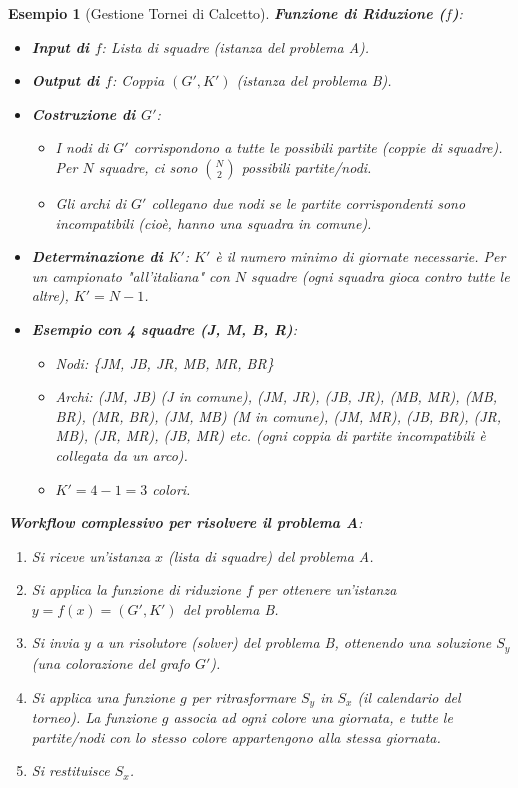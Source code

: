 \documentclass[a4paper]{article}
\newtheorem{example}[theorem]{Esempio}
\begin{document}
\begin{example}[Gestione Tornei di Calcetto]
\textbf{Funzione di Riduzione ($f$)}:
\begin{itemize}
    \item \textbf{Input di $f$}: Lista di squadre (istanza del problema A).
    \item \textbf{Output di $f$}: Coppia $(G', K')$ (istanza del problema B).
    \item \textbf{Costruzione di $G'$}:
        \begin{itemize}
            \item I nodi di $G'$ corrispondono a tutte le possibili partite (coppie di squadre). Per $N$ squadre, ci sono $\binom{N}{2}$ possibili partite/nodi.
            \item Gli archi di $G'$ collegano due nodi se le partite corrispondenti sono \textit{incompatibili} (cioè, hanno una squadra in comune).
        \end{itemize}
    \item \textbf{Determinazione di $K'$}: $K'$ è il numero minimo di giornate necessarie. Per un campionato "all'italiana" con $N$ squadre (ogni squadra gioca contro tutte le altre), $K' = N-1$.
    \item \textbf{Esempio con 4 squadre (J, M, B, R)}:
        \begin{itemize}
            \item Nodi: \{JM, JB, JR, MB, MR, BR\}
            \item Archi: (JM, JB) (J in comune), (JM, JR), (JB, JR), (MB, MR), (MB, BR), (MR, BR), (JM, MB) (M in comune), (JM, MR), (JB, BR), (JR, MB), (JR, MR), (JB, MR) etc. (ogni coppia di partite incompatibili è collegata da un arco).
            \item $K' = 4-1 = 3$ colori.
        \end{itemize}
\end{itemize}

\textbf{Workflow complessivo per risolvere il problema A}:
\begin{enumerate}
    \item Si riceve un'istanza $x$ (lista di squadre) del problema A.
    \item Si applica la funzione di riduzione $f$ per ottenere un'istanza $y = f(x) = (G', K')$ del problema B.
    \item Si invia $y$ a un risolutore (solver) del problema B, ottenendo una soluzione $S_y$ (una colorazione del grafo $G'$).
    \item Si applica una funzione $g$ per ritrasformare $S_y$ in $S_x$ (il calendario del torneo). La funzione $g$ associa ad ogni colore una giornata, e tutte le partite/nodi con lo stesso colore appartengono alla stessa giornata.
    \item Si restituisce $S_x$.
\end{enumerate}


\end{example}
\end{document}
